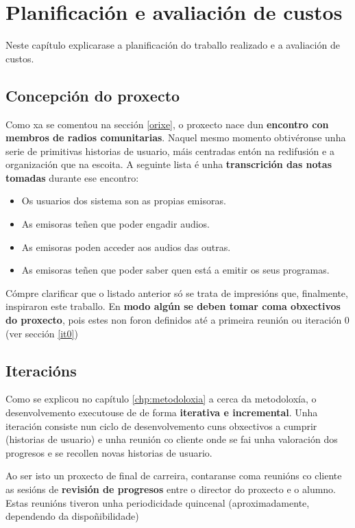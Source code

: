 \chapter[Planificación]{
  \label{chp:plan}
  Planificación e avaliación de custos
}
\minitoc
\newpage

Neste capítulo explicarase a planificación do traballo realizado e a avaliación de custos. 

\section{Concepción do proxecto}

Como xa se comentou na sección \ref{orixe}, o proxecto nace dun \textbf{encontro con membros de radios comunitarias}. Naquel mesmo momento obtivéronse unha serie de primitivas historias de usuario, máis centradas entón na redifusión e a organización que na escoita. A seguinte lista é unha \textbf{transcrición das notas tomadas} durante ese encontro:

\begin{itemize}
	\item Os usuarios dos sistema son as propias emisoras.
	\item As emisoras teñen que poder engadir audios.
	\item As emisoras poden acceder aos audios das outras.
	\item As emisoras teñen que poder saber quen está a emitir os seus programas.
\end{itemize}

Cómpre clarificar que o listado anterior só se trata de impresións que, finalmente, inspiraron este traballo. En \textbf{modo algún se deben tomar coma obxectivos do proxecto}, pois estes non foron definidos até a primeira reunión ou iteración 0 (ver sección \ref{it0})

\section{Iteracións}

Como se explicou no capítulo \ref{chp:metodoloxia} a cerca da metodoloxía, o desenvolvemento executouse de  de forma \textbf{iterativa e incremental}. Unha iteración consiste nun ciclo de desenvolvemento cuns obxectivos a cumprir (historias de usuario) e unha reunión co cliente onde se fai unha valoración dos progresos e se recollen novas historias de usuario.

Ao ser isto un proxecto de final de carreira, contaranse coma reunións co cliente as sesións de \textbf{revisión de progresos} entre o director do proxecto e o alumno. Estas reunións tiveron unha periodicidade quincenal (aproximadamente, dependendo da dispoñibilidade)


